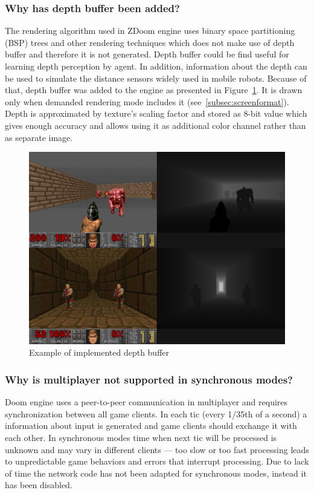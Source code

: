 \documentclass[english,bachelor,a4paper,twoside]{ppfcmthesis}
\begin{document}
\subsubsection{Why has depth buffer been added?}

The rendering algorithm used in ZDoom engine uses binary space partitioning (BSP) trees and other rendering techniques which does not make use of depth buffer and therefore it is not generated.
Depth buffer could be find useful for learning depth perception by agent.
In addition, information about the depth can be used to simulate the distance sensors widely used in mobile robots.  
Because of that, depth buffer was added to the engine as presented in Figure~\ref{fig:zbuffer}.
It is drawn only when demanded rendering mode includes it (see~\ref{subsec:screenformat}).
Depth is approximated by texture's scaling factor and stored as 8-bit value which gives enough accuracy and allows using it as additional color channel rather than as separate image.

\begin{figure}
\centering
\includegraphics[scale=0.3]{zbuffer.png}
\caption{Example of implemented depth buffer}
\label{fig:zbuffer}
\end{figure}

\subsubsection{Why is multiplayer not supported in synchronous modes?}\label{sec:architecture_solution_multi}

Doom engine uses a peer-to-peer communication in multiplayer and requires synchronization between all game clients. In each tic (every 1/35th of a second) a information about input is generated and game clients should exchange it with each other. 
In synchronous modes time when next tic will be processed is unknown and may vary in different clients --- too slow or too fast processing leads to unpredictable game behaviors and errors that interrupt processing. Due to lack of time the network code has not been adapted for synchronous modes, instead it has been disabled.
\end{document}
